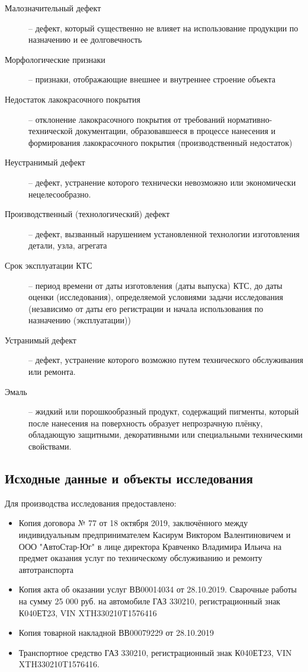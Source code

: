\begin{description}
\item[Малозначительный дефект] -- дефект, который существенно не влияет на использование продукции по назначению и ее долговечность
	\item[Морфологические признаки]-- признаки, отображающие внешнее и внутреннее строение объекта
	\item [Недостаток лакокрасочного покрытия] -- отклонение лакокрасочного покрытия от 	требований нормативно-технической документации, образовавшееся в процессе нанесения и
	формирования лакокрасочного покрытия (производственный недостаток)
	\item[Неустранимый дефект] -- дефект, устранение которого технически невозможно или экономически нецелесообразно.
	\item[Производственный (технологический) дефект] -- дефект, вызванный нарушением установленной технологии изготовления детали, узла, агрегата
	\item[Срок эксплуатации КТС]-- период времени от даты изготовления (даты выпуска) КТС, до даты оценки (исследования), определяемой условиями задачи исследования (независимо от даты его регистрации и начала использования по назначению (эксплуатации))
	\item[Устранимый дефект] -- дефект, устранение которого возможно путем технического
	обслуживания или ремонта.
	\item[Эмаль] -- жидкий или порошкообразный продукт, содержащий пигменты, который после
	нанесения на поверхность образует непрозрачную плёнку, обладающую защитными,
	декоративными или специальными техническими свойствами.
\end{description}
\subsection{Исходные данные и объекты исследования}

Для производства исследования предоставлено:
\begin{itemize}
	\item Копия договора № 77 от 18 октября 2019, заключённого между индивидуальным предпринимателем Касирум Виктором Валентиновичем и ООО "АвтоСтар-Юг" в лице директора Кравченко Владимира Ильича на предмет оказания услуг по техническому обслуживанию и ремонту автотранспорта 
	\item Копия акта об оказании услуг ВВ00014034 от 28.10.2019. Сварочные работы на сумму 25 000 руб.  на автомобиле ГАЗ 330210, регистрационный знак К040ЕТ23, VIN XTH330210T1576416
	\item Копия товарной накладной ВВ00079229 от 28.10.2019
	\item Транспортное средство ГАЗ 330210, регистрационный знак К040ЕТ23, VIN XTH330210T1576416.
	\end{itemize}

